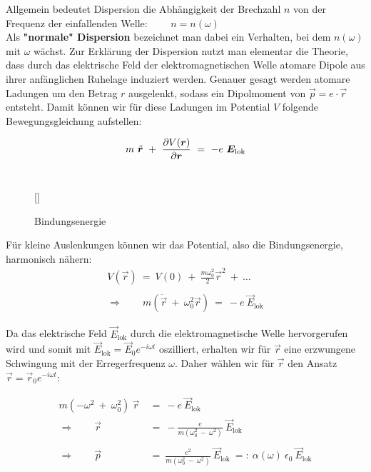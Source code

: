 Allgemein bedeutet Dispersion die Abhängigkeit der Brechzahl $n$ von der Frequenz der einfallenden Welle: $\qquad n = n (\omega)$\\
Als \textbf{"normale" Dispersion} bezeichnet man dabei ein Verhalten, bei dem $n(\omega)$ mit $\omega$ wächst.
Zur Erklärung der Dispersion nutzt man elementar die Theorie, dass  durch das elektrische Feld der elektromagnetischen Welle atomare Dipole aus ihrer anfänglichen Ruhelage induziert werden. Genauer gesagt werden atomare Ladungen um den Betrag $r$ ausgelenkt, sodass ein Dipolmoment von $\vec{p}=e\cdot\vec{r}$ entsteht.
\newpage
Damit können  wir für diese Ladungen im Potential $V$ folgende Bewegungsgleichung aufstellen:

\begin{equation*}
m \ \ddot{\vec{r}} \ + \ \pdiff{V(\vec{r})}{\vec{r}} \ = \ -e \ \vec{E}_{\text{lok}}
\end{equation*}
\ \\
\begin{wrapfigure}[10]{l}[0cm]{0cm}
	\raisebox{0pt}[\dimexpr{}\baselineskip\relax]{
		\colorbox{hgrey}{
		}
	}
	\caption{Bindungsenergie}
\end{wrapfigure}

Für kleine Auslenkungen können wir das Potential, also die Bindungsenergie, harmonisch nähern:
\begin{align*}
V(\vec{r})  \ = \ V(0) \ + \ \frac{m\omega_0^2}{2}\vec{r}^2 \ + \ \ldots\\
\ \\
\Rightarrow \qquad m \left(\ddot{\vec{r}} \ + \ \omega_0^2\vec{r}\right)  \ = \ - e \ \vec{E}_{\text{lok}}
\end{align*}

Da das elektrische Feld $\vec{E}_{\text{lok}}$ durch die elektromagnetische Welle hervorgerufen wird und somit mit $\vec{E}_{\text{lok}} = \vec{E}_0 e^{-i\omega t}$ oszilliert, erhalten wir für $\vec{r}$ eine erzwungene Schwingung mit der Erregerfrequenz $\omega$. Daher wählen wir für $\vec{r}$ den Ansatz $\vec{r}= \vec{r}_0 e^{-i\omega t}$:

\begin{align*}
m\left(-\omega^2 \ + \ \omega_0^2\right) \ \vec{r}  \ &= \ -e \ \vec{E}_{\text{lok}}\\
\Rightarrow \qquad \vec{r}  \ &= \ -\frac{e}{m\left(\omega^2_0 \ - \ \omega^2\right)} \ \vec{E}_{\text{lok}}\\
\ \\
\Rightarrow \qquad \vec{p}  \ &= \ \frac{e^2}{m\left(\omega_0^2 \ - \ \omega^2\right)} \ \vec{E}_{\text{lok}}  \ =: \ \alpha (\omega) \ \epsilon_0 \ \vec{E}_{\text{lok}}
\end{align*}

